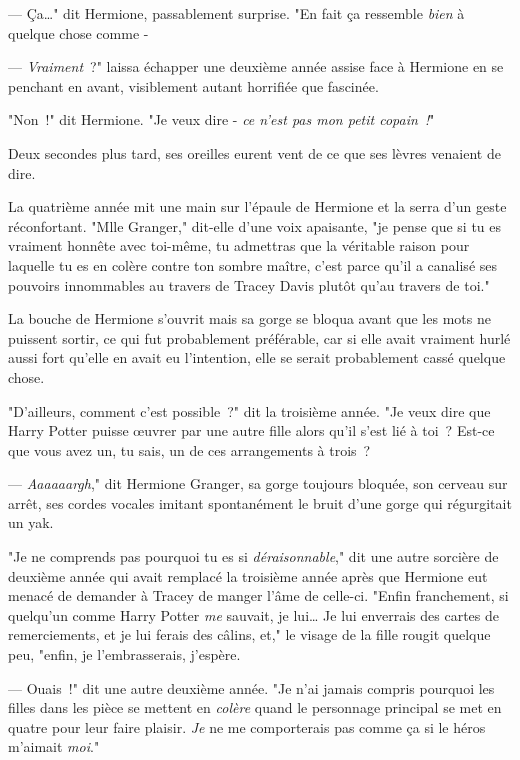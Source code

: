 --- Ça…" dit Hermione, passablement surprise. "En fait ça ressemble \emph{bien} à quelque chose comme -

--- \emph{Vraiment}~?" laissa échapper une deuxième année assise face à Hermione en se penchant en avant, visiblement autant horrifiée que fascinée.

"Non~!" dit Hermione. "Je veux dire - \emph{ce n'est pas mon petit copain~!}"

Deux secondes plus tard, ses oreilles eurent vent de ce que ses lèvres venaient de dire.

La quatrième année mit une main sur l'épaule de Hermione et la serra d'un geste réconfortant. "Mlle Granger," dit-elle d'une voix apaisante, "je pense que si tu es vraiment honnête avec toi-même, tu admettras que la véritable raison pour laquelle tu es en colère contre ton sombre maître, c'est parce qu'il a canalisé ses pouvoirs innommables au travers de Tracey Davis plutôt qu'au travers de toi."

La bouche de Hermione s'ouvrit mais sa gorge se bloqua avant que les mots ne puissent sortir, ce qui fut probablement préférable, car si elle avait vraiment hurlé aussi fort qu'elle en avait eu l'intention, elle se serait probablement cassé quelque chose.

"D'ailleurs, comment c'est possible~?" dit la troisième année. "Je veux dire que Harry Potter puisse œuvrer par une autre fille alors qu'il s'est lié à toi~? Est-ce que vous avez un, tu sais, un de ces arrangements à trois~?

--- \emph{Aaaaaargh}," dit Hermione Granger, sa gorge toujours bloquée, son cerveau sur arrêt, ses cordes vocales imitant spontanément le bruit d'une gorge qui régurgitait un yak.


"Je ne comprends pas pourquoi tu es si \emph{déraisonnable}," dit une autre sorcière de deuxième année qui avait remplacé la troisième année après que Hermione eut menacé de demander à Tracey de manger l'âme de celle-ci. "Enfin franchement, si quelqu'un comme Harry Potter \emph{me} sauvait, je lui… Je lui enverrais des cartes de remerciements, et je lui ferais des câlins, et," le visage de la fille rougit quelque peu, "enfin, je l'embrasserais, j'espère.

--- Ouais~!" dit une autre deuxième année. "Je n'ai jamais compris pourquoi les filles dans les pièce se mettent en \emph{colère} quand le personnage principal se met en quatre pour leur faire plaisir. \emph{Je} ne me comporterais pas comme ça si le héros m'aimait \emph{moi}."

